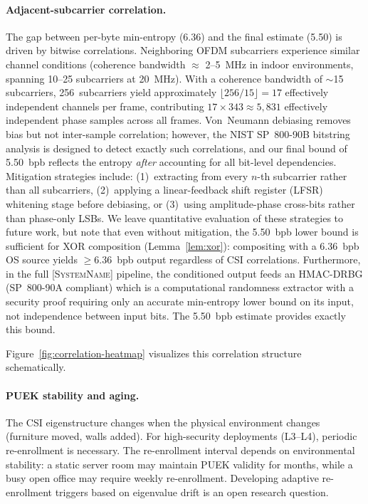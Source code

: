 \documentclass[sigconf,nonacm=false,anonymous]{acmart}
\newcommand{\zipminator}{\textsc{[SystemName]}\xspace}
\begin{document}
\paragraph{Adjacent-subcarrier correlation.}
The gap between per-byte min-entropy (6.36) and the final estimate (5.50) is driven by bitwise correlations.
Neighboring OFDM subcarriers experience similar channel conditions (coherence bandwidth $\approx$ 2--5~MHz in indoor environments, spanning 10--25 subcarriers at 20~MHz).
With a coherence bandwidth of $\sim$15 subcarriers, 256~subcarriers yield approximately $\lfloor 256/15 \rfloor = 17$ effectively independent channels per frame, contributing $17 \times 343 \approx 5{,}831$ effectively independent phase samples across all frames.
Von~Neumann debiasing removes bias but not inter-sample correlation; however, the NIST SP~800-90B bitstring analysis is designed to detect exactly such correlations, and our final bound of 5.50~bpb reflects the entropy \emph{after} accounting for all bit-level dependencies.
Mitigation strategies include: (1)~extracting from every $n$-th subcarrier rather than all subcarriers, (2)~applying a linear-feedback shift register (LFSR) whitening stage before debiasing, or (3)~using amplitude-phase cross-bits rather than phase-only LSBs.
We leave quantitative evaluation of these strategies to future work, but note that even without mitigation, the 5.50~bpb lower bound is sufficient for XOR composition (Lemma~\ref{lem:xor}): compositing with a 6.36~bpb OS source yields $\geq$6.36~bpb output regardless of CSI correlations.
Furthermore, in the full \zipminator pipeline, the conditioned output feeds an HMAC-DRBG (SP~800-90A compliant) which is a computational randomness extractor with a security proof requiring only an accurate min-entropy lower bound on its input, not independence between input bits.
The 5.50~bpb estimate provides exactly this bound.

Figure~\ref{fig:correlation-heatmap} visualizes this correlation structure schematically.



\paragraph{PUEK stability and aging.}
The CSI eigenstructure changes when the physical environment changes (furniture moved, walls added).
For high-security deployments (L3--L4), periodic re-enrollment is necessary.
The re-enrollment interval depends on environmental stability: a static server room may maintain PUEK validity for months, while a busy open office may require weekly re-enrollment.
Developing adaptive re-enrollment triggers based on eigenvalue drift is an open research question.
\end{document}
